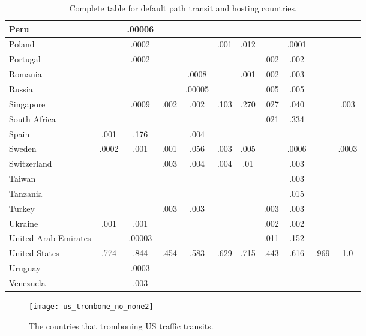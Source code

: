 \begin{table*}[h!]
\begin{tabular}{|P{37mm}|cc|cc|cc|cc|cc|}
Peru             &     &.00006   &     &  &   &   &   &     &  & \\\hline
Poland             &    &.0002   &     &  &.001    &.012   &   &.0001     &  & \\\hline
Portugal             &    &.0002   &     &  &   &   &.002    &.002     &  & \\\hline
Romania             &     &   &     &.0008  &   &.001   &.002    &.003     &  & \\\hline
Russia             &    &  &     &.00005  &   &   &.005   &.005     &  & \\\hline
Singapore             &    &.0009   &.002     &.002  &.103    &.270   &.027    &.040     &  &.003 \\\hline
South Africa             &    &   &     &  &   &   &.021    &.334     &  & \\\hline
Spain             &.001     &.176   &    &.004  &   &   &   &     &  & \\\hline
Sweden             &.0002     &.001   &.001     &.056  &.003    &.005   &   &.0006     &  &.0003 \\\hline
Switzerland             &     &   &.003     &.004  &.004   &.01   &   &.003     &  & \\\hline
Taiwan             &     &   &     &  &   &  &    &.003     &  & \\\hline
Tanzania             &    &   &     &  &   &   &   &.015     &  & \\\hline
Turkey             &     &   &.003     &.003  &   &   &.003    &.003     &  & \\\hline
Ukraine             &.001     &.001   &     &  &    &   &.002    &.002     &  & \\\hline
United Arab Emirates             &     &.00003   &     &  &   &   &.011    &.152     &  & \\\hline
United States             &.774     &.844   &.454     &.583  &.629    &.715   &.443    &.616     &.969  &1.0 \\\hline
Uruguay             &     &.0003   &    &  &    &   &   &     &  & \\\hline
Venezuela             &    &.003   &     &  &   &   &   &     &  & \\\hline
\end{tabular}
\caption{Complete table for default path transit and hosting countries.}
\label{tab:complete_transit_host}
\end{table*}

\begin{figure}
\centering
\texttt{[image: us\_trombone\_no\_none2]}
\caption{The countries that tromboning US traffic transits.}
\label{fig:trombone_us}
\end{figure}

